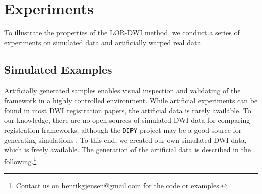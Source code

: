 \documentclass[twocolumn]{svjour3}
\begin{document}
\section{Experiments}

To illustrate the properties of the LOR-DWI method, we conduct a series of experiments on
simulated data and artificially warped real data.

\subsection{Simulated Examples}
\label{sec:artitest}

Artificially generated samples enables visual inspection and validating of the framework
in a highly controlled environment. While artificial experiments can be found in most DWI
registration papers, the artificial data is rarely available. To our knowledge, there are
no open sources of simulated DWI data for comparing registration frameworks, although the
\texttt{DIPY} project may be a good source for generating simulations
\cite{garyfallidis2014dipy}. To this end, we created our own simulated DWI data, which is
freely available. The generation of the artificial data is described in the
following.\footnote{Contact us on \url{henrikgjensen@gmail.com} for the code or
  examples.} %
\end{document}
